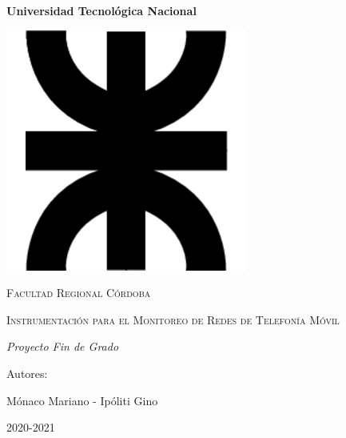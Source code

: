 \documentclass[a4paper,12pt]{report} %
\begin{document}
	
%
	


	 \begin{titlepage}
		\centering
		\vspace{1cm}
		{\bfseries\LARGE Universidad Tecnológica Nacional \par}
		\vspace{1cm}
		{\includegraphics[scale=0.5]{logo}\par}
		\vspace{2cm}
		{\scshape\Large Facultad Regional Córdoba \par}
		\vspace{3cm}
		{\scshape\Huge Instrumentación para el Monitoreo de Redes de Telefonía Móvil \par}
		\vspace{3cm}
		{\itshape\Large Proyecto Fin de Grado \par}
		\vfill
		{\Large Autores: \par} %
		{\Large Mónaco Mariano - Ipóliti Gino \par}
		{\Large 2020-2021 \par}
	\end{titlepage} 

	
	
\tableofcontents
\thispagestyle{empty}
\cleardoublepage
\setcounter{page}{1}
\end{document}
